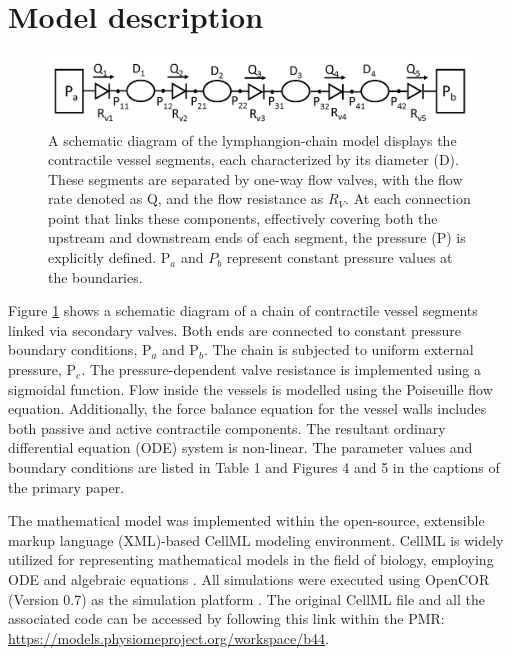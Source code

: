 \documentclass[fleqn,10pt]{physiome}
\begin{document}
\section{Model description}
\begin{figure}
    \centering
    \includegraphics[trim=3.10cm 7.0cm 0.10cm 7.0cm, clip=true, totalheight=0.2\textheight,  ]{Lymphangion_model.png}
    \caption{A schematic diagram of the lymphangion-chain model displays the contractile vessel segments, each characterized by its diameter (D). These segments are separated by one-way flow valves, with the flow rate denoted as Q, and the flow resistance as $R_{V}$. At each connection point that links these components, effectively covering both the upstream and downstream ends of each segment, the pressure (P) is explicitly defined. P$_{a}$ and $P_{b}$ represent constant pressure values at the boundaries. }
    \label{fig:schematic}
\end{figure}

Figure \ref{fig:schematic} shows a schematic diagram of a chain of contractile vessel segments linked via secondary valves. Both ends are connected to constant pressure boundary conditions, P$_{a}$ and P$_{b}$. The chain is subjected to uniform external pressure, P$_{e}$. The pressure-dependent valve resistance is implemented using a sigmoidal function. Flow inside the vessels is modelled using the Poiseuille flow equation. Additionally, the force balance equation for the vessel walls includes both passive and active contractile components. The resultant ordinary differential equation (ODE) system is non-linear. The parameter values and boundary conditions are listed in Table 1 and Figures 4 and 5 in the captions of the primary paper.

The mathematical model was implemented within the open-source, extensible markup language (XML)-based CellML modeling environment. CellML is widely utilized for representing mathematical models in the field of biology, employing ODE and algebraic equations \citep{cuellar2003overview}. All simulations were executed using OpenCOR (Version 0.7) as the simulation platform \citep{garny2015opencor}. The original CellML file and all the associated code can be accessed by following this link within the PMR: \url{https://models.physiomeproject.org/workspace/b44}.
\end{document}

